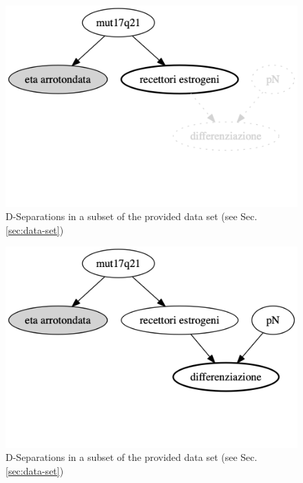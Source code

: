 \begin{figure}[htbp]
\centerline{\includegraphics[width=\columnwidth]{mathematical-background/images/bn-example-separations-2}}
\caption{D-Separations in a subset of the provided data set (see Sec. \ref{sec:data-set})}
\label{fig:bn-separations-example-2}
\end{figure}

\begin{figure}[htbp]
\centerline{\includegraphics[width=\columnwidth]{mathematical-background/images/bn-example-separations-3}}
\caption{D-Separations in a subset of the provided data set (see Sec. \ref{sec:data-set})}
\label{fig:bn-separations-example-3}
\end{figure}
